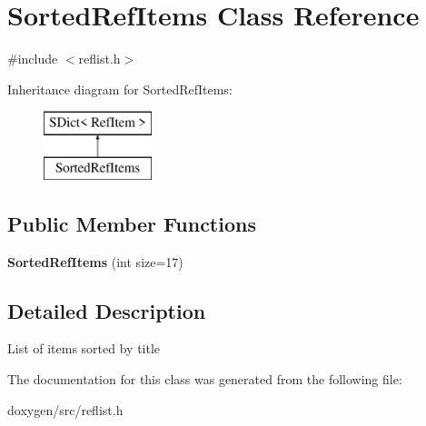 \hypertarget{class_sorted_ref_items}{}\section{Sorted\+Ref\+Items Class Reference}
\label{class_sorted_ref_items}


{\ttfamily \#include $<$reflist.\+h$>$}

Inheritance diagram for Sorted\+Ref\+Items\+:\begin{figure}[H]
\begin{center}
\leavevmode
\includegraphics[height=2.000000cm]{class_sorted_ref_items}
\end{center}
\end{figure}
\subsection*{Public Member Functions}
\begin{DoxyCompactItemize}
\item 
\mbox{\label{class_sorted_ref_items_a1c8368e6dbe2f7307716f1c987e3ceb6}} 
{\bfseries Sorted\+Ref\+Items} (int size=17)
\end{DoxyCompactItemize}


\subsection{Detailed Description}
List of items sorted by title 

The documentation for this class was generated from the following file\+:\begin{DoxyCompactItemize}
\item 
doxygen/src/reflist.\+h\end{DoxyCompactItemize}
